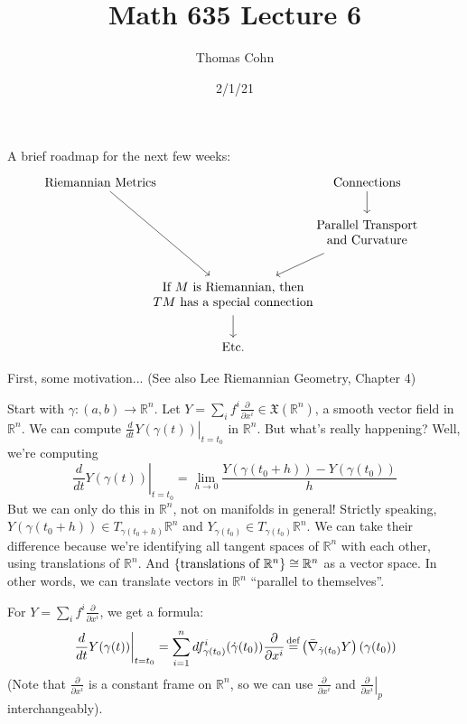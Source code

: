 \documentclass[10pt,letterpaper]{article}
\author{Thomas Cohn}
\title{Math 635 Lecture 6}
\date{2/1/21} %
\newcommand{\n}{\hfill\break}
\newcommand{\ptxt}[1]{\textrm{\textnormal{#1}}}
\newcommand{\set}[1]{\left\{#1\right\}}
\newcommand{\reals}{\mathbb{R}}
\newcommand{\R}{\reals}
\newcommand{\pdat}[3]{\left.\pd{#1}{#2}\right|_{#3}}
\newcommand{\restr}[2]{\left.#1\right|_{#2}}
\newcommand{\pd}[2]{\frac{\partial{}#1}{\partial{}#2}}
\newcommand{\labeledeq}[1]{\overset{\mathclap{\ptxt{#1}}}{=}}
\newcommand{\eqdef}{\labeledeq{def}}
\newcommand{\paren}[1]{\left(#1\right)}
\begin{document}
\maketitle
\setlength\RaggedRightParindent{\parindent}
\RaggedRight

\par\noindent
A brief roadmap for the next few weeks:
\[
	\begin{tikzcd}
		\ptxt{Riemannian Metrics} \arrow[ddr] &[-40pt] &[-40pt] \ptxt{Connections} \arrow[d]\\
		& & \begin{array}{c}
			\ptxt{Parallel Transport}\\
			\ptxt{and Curvature}
		\end{array} \arrow[dl]\\
		& \begin{array}{c}
			\ptxt{If $M$ is Riemannian, then}\\
			\ptxt{$TM$ has a special connection}
		\end{array} \arrow[d]\\
		& \ptxt{Etc.}
	\end{tikzcd}
\]

\par\noindent
First, some motivation... (See also Lee Riemannian Geometry, Chapter 4)\n

\par\noindent
Start with $\gamma:(a,b)\to\R^{n}$. Let $Y=\sum_{i}f^{i}\pd{}{x^{i}}\in\mathfrak{X}(\R^{n})$, a smooth vector field in $\R^{n}$. We can compute $\restr{\frac{d}{dt}Y(\gamma(t))}{t=t_{0}}$ in $\R^{n}$. But what's really happening? Well, we're computing
\[
	\restr{\frac{d}{dt}Y(\gamma(t))}{t=t_{0}}=\lim_{h\to{}0}\frac{Y(\gamma(t_{0}+h))-Y(\gamma(t_{0}))}{h}
\]
But we can only do this in $\R^{n}$, not on manifolds in general! Strictly speaking, $Y(\gamma(t_{0}+h))\in{}T_{\gamma(t_{0}+h)}\R^{n}$ and $Y_{\gamma(t_{0})}\in{}T_{\gamma(t_{0})}\R^{n}$. We can take their difference because we're identifying all tangent spaces of $\R^{n}$ with each other, using translations of $\R^{n}$. And $\set{\ptxt{translations of $\R^{n}$}}\cong\R^{n}$ as a vector space. In other words, we can translate vectors in $\R^{n}$ ``parallel to themselves''.\n

\par\noindent
For $Y=\sum_{i}f^{i}\pd{}{x^{i}}$, we get a formula:
\[
	\restr{\frac{d}{dt}Y(\gamma(t))}{t=t_{0}}=\sum_{i=1}^{n}df_{\gamma(t_{0})}^{i}(\dot\gamma(t_{0}))\pd{}{x^{i}}\eqdef\paren{\bar\nabla_{\dot\gamma(t_{0})}Y}(\gamma(t_{0}))
\]
(Note that $\pd{}{x^{i}}$ is a constant frame on $\R^{n}$, so we can use $\pd{}{x^{i}}$ and $\pdat{}{x^{i}}{p}$ interchangeably).\n
\end{document}
